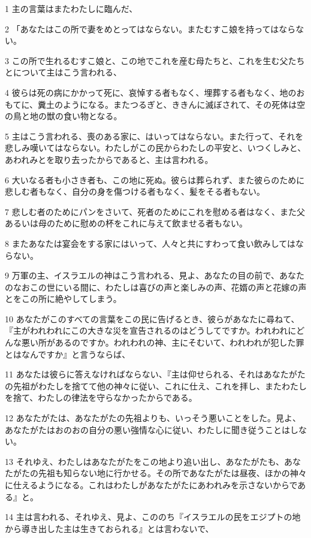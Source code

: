 \par 1 主の言葉はまたわたしに臨んだ、
\par 2 「あなたはこの所で妻をめとってはならない。またむすこ娘を持ってはならない。
\par 3 この所で生れるむすこ娘と、この地でこれを産む母たちと、これを生む父たちとについて主はこう言われる、
\par 4 彼らは死の病にかかって死に、哀悼する者もなく、埋葬する者もなく、地のおもてに、糞土のようになる。またつるぎと、ききんに滅ぼされて、その死体は空の鳥と地の獣の食い物となる。
\par 5 主はこう言われる、喪のある家に、はいってはならない。また行って、それを悲しみ嘆いてはならない。わたしがこの民からわたしの平安と、いつくしみと、あわれみとを取り去ったからであると、主は言われる。
\par 6 大いなる者も小さき者も、この地に死ぬ。彼らは葬られず、また彼らのために悲しむ者もなく、自分の身を傷つける者もなく、髪をそる者もない。
\par 7 悲しむ者のためにパンをさいて、死者のためにこれを慰める者はなく、また父あるいは母のために慰めの杯をこれに与えて飲ませる者もない。
\par 8 またあなたは宴会をする家にはいって、人々と共にすわって食い飲みしてはならない。
\par 9 万軍の主、イスラエルの神はこう言われる、見よ、あなたの目の前で、あなたのなおこの世にいる間に、わたしは喜びの声と楽しみの声、花婿の声と花嫁の声とをこの所に絶やしてしまう。
\par 10 あなたがこのすべての言葉をこの民に告げるとき、彼らがあなたに尋ねて、『主がわれわれにこの大きな災を宣告されるのはどうしてですか。われわれにどんな悪い所があるのですか。われわれの神、主にそむいて、われわれが犯した罪とはなんですか』と言うならば、
\par 11 あなたは彼らに答えなければならない、『主は仰せられる、それはあなたがたの先祖がわたしを捨てて他の神々に従い、これに仕え、これを拝し、またわたしを捨て、わたしの律法を守らなかったからである。
\par 12 あなたがたは、あなたがたの先祖よりも、いっそう悪いことをした。見よ、あなたがたはおのおの自分の悪い強情な心に従い、わたしに聞き従うことはしない。
\par 13 それゆえ、わたしはあなたがたをこの地より追い出し、あなたがたも、あなたがたの先祖も知らない地に行かせる。その所であなたがたは昼夜、ほかの神々に仕えるようになる。これはわたしがあなたがたにあわれみを示さないからである』と。
\par 14 主は言われる、それゆえ、見よ、こののち『イスラエルの民をエジプトの地から導き出した主は生きておられる』とは言わないで、
